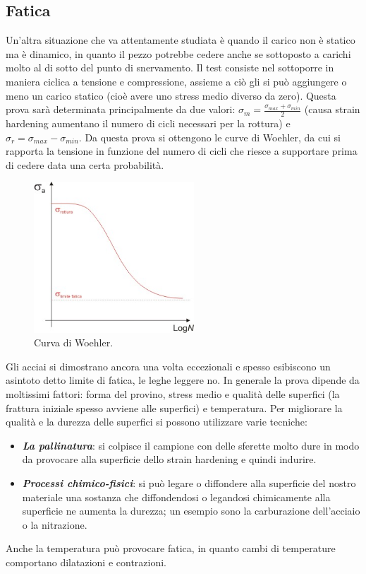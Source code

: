 \subsection{Fatica}

Un'altra situazione che va attentamente studiata è quando il carico non è statico ma è dinamico, in quanto il pezzo potrebbe cedere anche se sottoposto a carichi molto al di sotto del punto di snervamento.
Il test consiste nel sottoporre in maniera ciclica a tensione e compressione, assieme a ciò gli si può aggiungere o meno un carico statico (cioè avere uno stress medio diverso da zero). Questa prova sarà determinata principalmente da due valori: $\sigma_m=\frac{\sigma_{max}+\sigma_{min}}{2}$ (causa strain hardening aumentano il numero di cicli necessari per la rottura) e $\sigma_r=\sigma_{max}-\sigma_{min}$.
Da questa prova si ottengono le curve di Woehler, da cui si rapporta la tensione in funzione del numero di cicli che riesce a supportare prima di cedere data una certa probabilità.

\begin{figure}[h]
    \centering
    \includegraphics[width=6cm]{frattura/Curva_wohler.jpg}
    \caption{Curva di Woehler.}
    \label{Curva_wohler}
\end{figure}

Gli acciai si dimostrano ancora una volta eccezionali e spesso esibiscono un asintoto detto limite di fatica, le leghe leggere no. In generale la prova dipende da moltissimi fattori: forma del provino, stress medio e qualità delle superfici (la frattura iniziale spesso avviene alle superfici) e temperatura. Per migliorare la qualità e la durezza delle superfici si possono utilizzare varie tecniche:
\begin{itemize}
    \item \textbf{\textit{La pallinatura}}: si colpisce il campione con delle sferette molto dure in modo da provocare alla superficie dello strain hardening e quindi indurire.
    \item \textbf{\textit{Processi chimico-fisici}}: si può legare o diffondere alla superficie del nostro materiale una sostanza che diffondendosi o legandosi chimicamente alla superficie ne aumenta la durezza; un esempio sono la carburazione dell'acciaio o la nitrazione.
\end{itemize}
Anche la temperatura può provocare fatica, in quanto cambi di temperature comportano dilatazioni e contrazioni.

